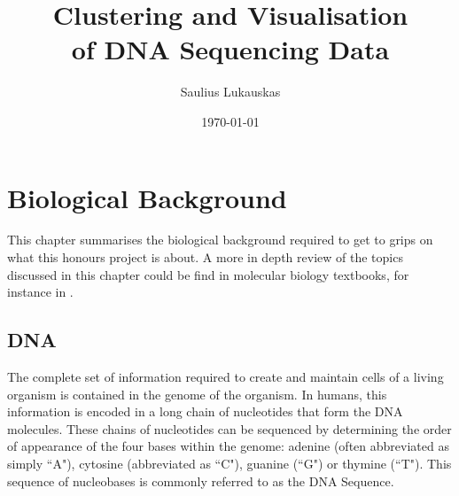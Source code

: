 \documentclass[parskip]{cs4rep}
\begin{document}
\title{Clustering and Visualisation\\ of DNA Sequencing Data}

\author{Saulius Lukauskas}


\date{\today}


\maketitle


\tableofcontents



\chapter{Biological Background}
This chapter summarises the biological background required to get to grips on what this honours project is about. 
A more in depth review of the topics discussed in this chapter could be find in molecular biology textbooks, for instance in \cite{Alberts:2002te}.

\section{DNA}

The complete set of information required to create and maintain cells of a
living organism is contained in the genome of the organism. In humans, this
information is encoded in a long chain of nucleotides that form the DNA molecules. 
These chains of nucleotides can be sequenced by determining the order of appearance
of the four bases within the genome: adenine (often abbreviated as simply ``A"), cytosine (abbreviated as ``C"),
guanine (``G") or thymine (``T").
This sequence of nucleobases is commonly referred to as the DNA Sequence. 
\end{document}

